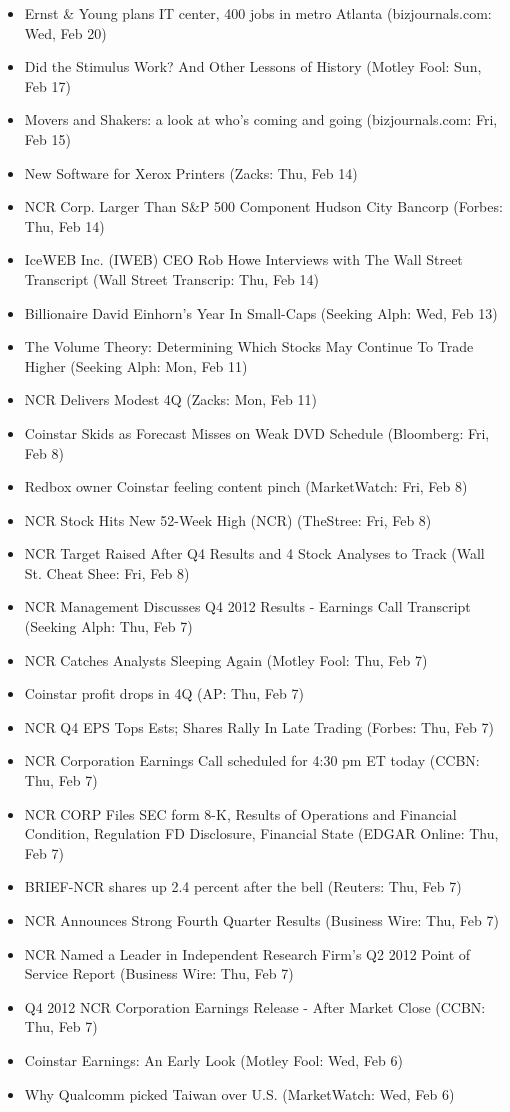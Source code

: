 \documentclass[11pt,asymmetric]{article}
\begin{document}
\begin{itemize}
\item Ernst \& Young plans IT center, 400 jobs in metro Atlanta (bizjournals.com: Wed, Feb 20)
\item Did the Stimulus Work? And Other Lessons of History (Motley Fool: Sun, Feb 17)
\item Movers and Shakers: a look at who’s coming and going (bizjournals.com: Fri, Feb 15)
\item New Software for Xerox Printers (Zacks: Thu, Feb 14)
\item NCR Corp. Larger Than S\&P 500 Component Hudson City Bancorp (Forbes: Thu, Feb 14)
\item IceWEB Inc. (IWEB) CEO Rob Howe Interviews with The Wall Street Transcript (Wall Street Transcrip: Thu, Feb 14)
\item Billionaire David Einhorn's Year In Small-Caps (Seeking Alph: Wed, Feb 13)
\item The Volume Theory: Determining Which Stocks May Continue To Trade Higher (Seeking Alph: Mon, Feb 11)
\item NCR Delivers Modest 4Q (Zacks: Mon, Feb 11)
\item Coinstar Skids as Forecast Misses on Weak DVD Schedule (Bloomberg: Fri, Feb 8)
\item Redbox owner Coinstar feeling content pinch (MarketWatch: Fri, Feb 8)
\item NCR Stock Hits New 52-Week High (NCR) (TheStree: Fri, Feb 8)
\item NCR Target Raised After Q4 Results and 4 Stock Analyses to Track (Wall St. Cheat Shee: Fri, Feb 8)
\item NCR Management Discusses Q4 2012 Results - Earnings Call Transcript (Seeking Alph: Thu, Feb 7)
\item NCR Catches Analysts Sleeping Again (Motley Fool: Thu, Feb 7)
\item Coinstar profit drops in 4Q (AP: Thu, Feb 7)
\item NCR Q4 EPS Tops Ests; Shares Rally In Late Trading (Forbes: Thu, Feb 7)
\item NCR Corporation Earnings Call scheduled for 4:30 pm ET today (CCBN: Thu, Feb 7)
\item NCR CORP Files SEC form 8-K, Results of Operations and Financial Condition, Regulation FD Disclosure, Financial State (EDGAR Online: Thu, Feb 7)
\item BRIEF-NCR shares up 2.4 percent after the bell (Reuters: Thu, Feb 7)
\item NCR Announces Strong Fourth Quarter Results (Business Wire: Thu, Feb 7)
\item NCR Named a Leader in Independent Research Firm’s Q2 2012 Point of Service Report (Business Wire: Thu, Feb 7)
\item Q4 2012 NCR Corporation Earnings Release - After Market Close (CCBN: Thu, Feb 7)
\item Coinstar Earnings: An Early Look (Motley Fool: Wed, Feb 6)
\item Why Qualcomm picked Taiwan over U.S. (MarketWatch: Wed, Feb 6)
\end{itemize}
\end{document}
